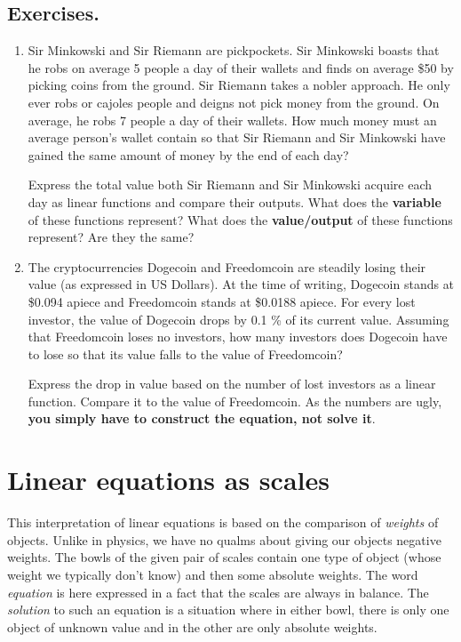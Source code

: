 \documentclass[a4paper,11pt]{article}
\begin{document}
\subsection*{Exercises.}
\begin{enumerate}[topsep=0pt,label=\arabic*.]
 \item Sir Minkowski and Sir Riemann are pickpockets. Sir Minkowski boasts that
  he robs on average 5 people a day of their wallets and finds on average \$50
  by picking coins from the ground. Sir Riemann takes a nobler approach. He only
  ever robs or cajoles people and deigns not pick money from the ground. On
  average, he robs 7 people a day of their wallets. How much money must an
  average person's wallet contain so that Sir Riemann and Sir Minkowski have
  gained the same amount of money by the end of each day?

  Express the total value both Sir Riemann and Sir Minkowski acquire each day as
  linear functions and compare their outputs. What does the \textbf{variable} of
  these functions represent? What does the \textbf{value/output} of these
  functions represent? Are they the same?

 \item The cryptocurrencies Dogecoin and Freedomcoin are steadily losing their
  value (as expressed in US Dollars). At the time of writing, Dogecoin stands at
  \$0.094 apiece and Freedomcoin stands at \$0.0188 apiece. For every lost
  investor, the value of Dogecoin drops by 0.1 \% of its current value. Assuming
  that Freedomcoin loses no investors, how many investors does Dogecoin have to
  lose so that its value falls to the value of Freedomcoin?

  Express the drop in value based on the number of lost investors as a linear
  function. Compare it to the value of Freedomcoin. As the numbers are ugly,
  \textbf{you simply have to construct the equation, not solve it}.
\end{enumerate}

\section*{Linear equations as scales}

This interpretation of linear equations is based on the comparison of
\emph{weights} of objects. Unlike in physics, we have no qualms about giving our
objects negative weights. The bowls of the given pair of scales contain one type
of object (whose weight we typically don't know) and then some absolute weights.
The word \emph{equation} is here expressed in a fact that the scales are always
in balance. The \emph{solution} to such an equation is a situation where in
either bowl, there is only one object of unknown value and in the other are only
absolute weights.
\end{document}
